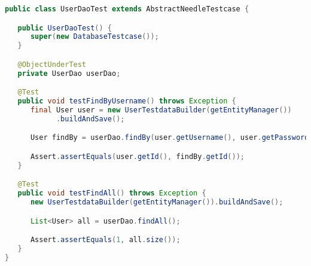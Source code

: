 \begin{lstlisting}[language={JAVA},caption=TestNG User DAO test]
public class UserDaoTest extends AbstractNeedleTestcase {

   public UserDaoTest() {
      super(new DatabaseTestcase());
   }

   @ObjectUnderTest
   private UserDao userDao;

   @Test
   public void testFindByUsername() throws Exception {
      final User user = new UserTestdataBuilder(getEntityManager())
            .buildAndSave();

      User findBy = userDao.findBy(user.getUsername(), user.getPassword());

      Assert.assertEquals(user.getId(), findBy.getId());
   }

   @Test
   public void testFindAll() throws Exception {
      new UserTestdataBuilder(getEntityManager()).buildAndSave();

      List<User> all = userDao.findAll();

      Assert.assertEquals(1, all.size());
   }
}
\end{lstlisting}